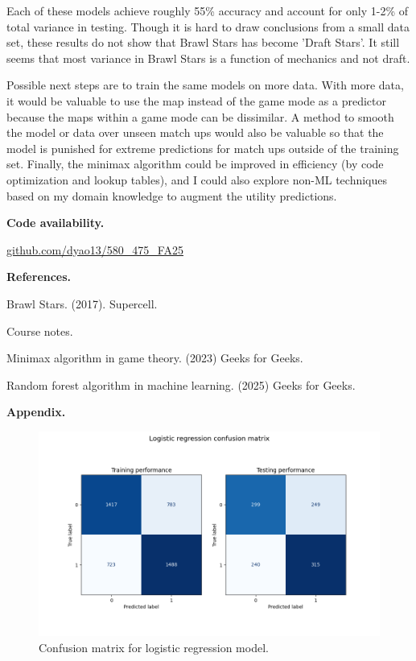 \documentclass[12pt]{article}
\begin{document}
Each of these models achieve roughly 55\% accuracy and account for only 1-2\% of total variance in testing. Though it is hard to draw conclusions from a small data set, these results do not show that Brawl Stars has become 'Draft Stars'. It still seems that most variance in Brawl Stars is a function of mechanics and not draft.

Possible next steps are to train the same models on more data. With more data, it would be valuable to use the map instead of the game mode as a predictor because the maps within a game mode can be dissimilar. A method to smooth the model or data over unseen match ups would also be valuable so that the model is punished for extreme predictions for match ups outside of the training set. Finally, the minimax algorithm could be improved in efficiency (by code optimization and lookup tables), and I could also explore non-ML techniques based on my domain knowledge to augment the utility predictions.

\textbf{Code availability.}

\href{https://github.com/dyao13/580_475_FA25}{github.com/dyao13/580\_475\_FA25}

\newpage \textbf{References.}

Brawl Stars. (2017). Supercell.

Course notes.

Minimax algorithm in game theory. (2023) Geeks for Geeks.

Random forest algorithm in machine learning. (2025) Geeks for Geeks.

\newpage \textbf{Appendix.}

\begin{figure}[h!]
\centering
\begin{center} \includegraphics[width=6in]{"../output/lr_confusion_matrix.png"} \end{center}
\caption{Confusion matrix for logistic regression model.}
\label{fig:lr-cm}
\end{figure}
\end{document}
